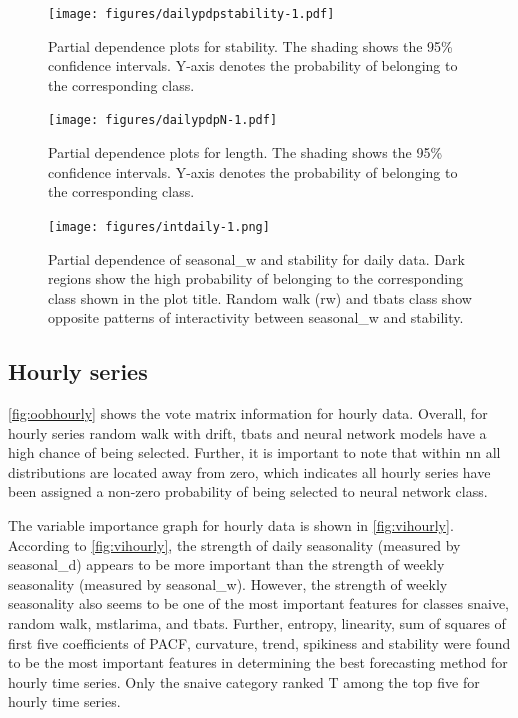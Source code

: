 \documentclass[11pt,a4paper,]{article}
\begin{document}
\begin{figure}
\centering
\texttt{[image: figures/dailypdpstability-1.pdf]}
\caption{\label{fig:dailypdpstability}Partial dependence plots for stability. The shading shows the 95\% confidence intervals. Y-axis denotes the probability of belonging to the corresponding class.}
\end{figure}

\begin{figure}
\centering
\texttt{[image: figures/dailypdpN-1.pdf]}
\caption{\label{fig:dailypdpN}Partial dependence plots for length. The shading shows the 95\% confidence intervals. Y-axis denotes the probability of belonging to the corresponding class.}
\end{figure}

\begin{figure}
\centering
\texttt{[image: figures/intdaily-1.png]}
\caption{\label{fig:intdaily}Partial dependence of seasonal\_w and stability for daily data. Dark regions show the high probability of belonging to the corresponding class shown in the plot title. Random walk (rw) and tbats class show opposite patterns of interactivity between seasonal\_w and stability.}
\end{figure}

\hypertarget{hourly-series}{%
\subsection{Hourly series}\label{hourly-series}}

\autoref{fig:oobhourly} shows the vote matrix information for hourly data. Overall, for hourly series random walk with drift, tbats and neural network models have a high chance of being selected. Further, it is important to note that within nn all distributions are located away from zero, which indicates all hourly series have been assigned a non-zero probability of being selected to neural network class.

The variable importance graph for hourly data is shown in \autoref{fig:vihourly}. According to \autoref{fig:vihourly}, the strength of daily seasonality (measured by seasonal\_d) appears to be more important than the strength of weekly seasonality (measured by seasonal\_w). However, the strength of weekly seasonality also seems to be one of the most important features for classes snaive, random walk, mstlarima, and tbats. Further, entropy, linearity, sum of squares of first five coefficients of PACF, curvature, trend, spikiness and stability were found to be the most important features in determining the best forecasting method for hourly time series. Only the snaive category ranked T among the top five for hourly time series.
\end{document}
